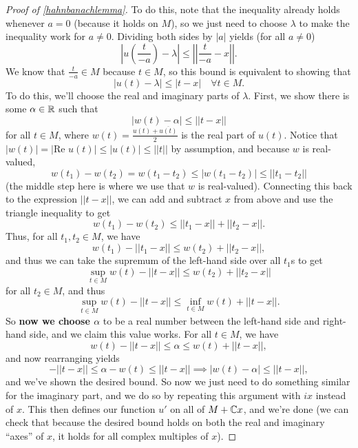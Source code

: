 \begin{proof}[Proof of \cref{hahnbanachlemma}]
To do this, note that the inequality already holds whenever $a = 0$ (because it holds on $M$), so we just need to choose $\lambda$ to make the inequality work for $a \ne 0$. Dividing both sides by $|a|$ yields (for all $a \ne 0$)
\[
    \left|u\left(\frac{t}{-a}\right) - \lambda\right| \le \left|\left|\frac{t}{-a} - x\right|\right|.
\]
We know that $\frac{t}{-a} \in M$ because $t \in M$, so this bound is equivalent to showing that 
\[
    |u(t) - \lambda| \le |t - x| \quad \forall t \in M.
\]
To do this, we'll choose the real and imaginary parts of $\lambda$. First, we show there is some $\alpha \in \mathbb R$ such that 
\[
    |w(t) - \alpha| \le ||t-x||
\]
for all $t \in M$, where $w(t) = \frac{u(t) + \overline{u(t)}}{2}$ is the real part of $u(t)$.  Notice that $|w(t)| = |\text{Re }u(t)| \le |u(t)| \le ||t||$ by assumption, and because $w$ is real-valued, 
\[
    w(t_1) - w(t_2) = w(t_1 - t_2) \le |w(t_1 - t_2)| \le ||t_1 - t_2||
\]
(the middle step here is where we use that $w$ is real-valued). Connecting this back to the expression $||t-x||$, we can add and subtract $x$ from above and use the triangle inequality to get
\[
    w(t_1) - w(t_2) \le ||t_1 - x|| + ||t_2 - x||.
\]
Thus, for all $t_1, t_2 \in M$, we have
\[
    w(t_1) - ||t_1 - x|| \le w(t_2) + ||t_2 - x||,
\]
and thus we can take the supremum of the left-hand side over all $t_1$s to get 
\[
    \sup_{t \in M} w(t) - ||t-x|| \le w(t_2) + ||t_2 - x||
\]
for all $t_2 \in M$, and thus
\[
    \sup_{t \in M} w(t) - ||t-x|| \le \inf_{t \in M} w(t) + ||t - x||.
\]
So \textbf{now we choose $\alpha$} to be a real number between the left-hand side and right-hand side, and we claim this value works. For all $t \in M$, we have
\[
    w(t) - ||t-x|| \le \alpha \le w(t) + ||t-x||,
\]
and now rearranging yields
\[
    -||t-x|| \le \alpha - w(t) \le ||t-x|| \implies |w(t) - \alpha| \le ||t-x||,
\]
and we've shown the desired bound. So now we just need to do something similar for the imaginary part, and we do so by repeating this argument with $ix$ instead of $x$. This then defines our function $u'$ on all of $M + \mathbb C x$, and we're done (we can check that because the desired bound holds on both the real and imaginary ``axes'' of $x$, it holds for all complex multiples of $x$). 
\end{proof}